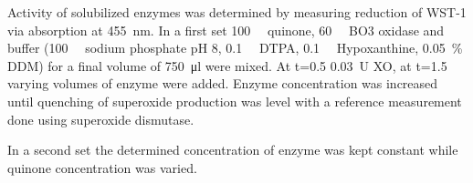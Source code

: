 Activity of solubilized enzymes was determined by measuring reduction of WST-1
via absorption at \SI{455}{\nm}. In a first set \SI{100}{\micro\Molar} quinone,
\SI{60}{\nano\Molar} BO3 oxidase and buffer (\SI{100}{\milli\Molar} sodium
phosphate pH 8, \SI{0.1}{\milli\Molar} DTPA, \SI{0.1}{\milli\Molar}
Hypoxanthine, \SI{0.05}{\percent} DDM) for a final volume of \SI{750}{\ul} were
mixed. At t=\SI{0.5}{\min} \SI{0.03}{U} XO, at t=\SI{1.5}{\min} varying volumes
of enzyme were added. Enzyme concentration was increased until quenching of
superoxide production was level with a reference measurement done using
superoxide dismutase.

In a second set the determined concentration of enzyme was kept constant while
quinone concentration was varied.

\normalsize
